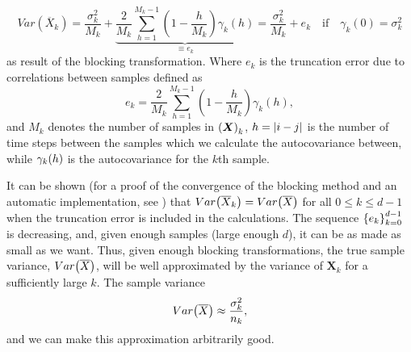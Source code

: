 \begin{equation*}
Var(\overline{X}_k) = \frac{\sigma_k^2}{M_k} + \underbrace{\frac{2}{M_k} \sum_{h=1}^{M_k-1}\left( 1 - \frac{h}{M_k} \right)\gamma_k(h)}_{\equiv e_k} = \frac{\sigma^2_k}{M_k} + e_k \quad \text{if} \quad \gamma_k(0) = \sigma_k^2
\label{eq:var_bloc} 
\end{equation*}
as result of the blocking transformation. Where $e_k$ is the truncation error due to correlations between samples defined as
\begin{equation*}
e_k = \frac{2}{M_k} \sum_{h=1}^{M_k-1}\left( 1 - \frac{h}{M_k} \right)\gamma_k(h), 
\label{eq:truncartion} 
\end{equation*}
and $M_k$ denotes the number of samples in $\qty(\bm{X})_k$, $h=\abs{i-j}$ is the number of time steps between the samples which we calculate the autocovariance between, while $\gamma_k\qty(h)$ is the autocovariance for the $k$th sample. 

It can be shown (for a proof of the convergence of the blocking method and an automatic implementation, see \citep{MariusJonsson}) that $Var\qty(\overline{X}_k)=Var\qty(\overline{X})$  for all $0 \leq k \leq d-1$ when the truncation error is included in the calculations. The sequence $\qty{e_k}_{k=0}^{d-1}$ is decreasing, and, given enough samples (large enough $d$), it can be as made as small as we want. Thus, given enough blocking transformations, the true sample variance, $Var\qty(\overline{X})$, will be well approximated by the variance of $\bm{X}_k$ for a sufficiently large $k$. The sample variance 
\begin{equation}
    Var\qty(\overline{X}) \approx \frac{\sigma_k^2}{n_k}, 
\end{equation}
and we can make this approximation arbitrarily good.





